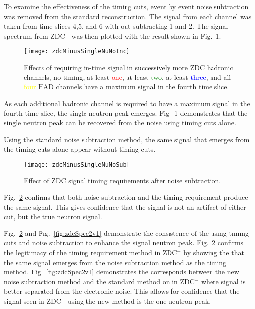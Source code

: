       To examine the effectiveness of the timing cuts, event by event noise 
        subtraction was removed from the standard reconstruction.
      The signal from each channel was taken from time slices 4,5, and 6 with
        out subtracting 1 and 2.
      The signal spectrum from ZDC$^{-}$ was then plotted with the result
        shown in Fig.~\ref{fig:zdcTimingCuts}.
      \begin{figure}[!Hhbt]
        \centering
        \texttt{[image: zdcMinusSingleNuNoInc]}
        \caption{Effects of requiring in-time signal in successively more 
          ZDC hadronic channels, no timing, at least \textcolor{red}{one}, at least \textcolor{green}{two},
            at least \textcolor{blue}{three}, and all \textcolor{yellow}{four} HAD channels have a maximum signal
            in the fourth time slice.}
        \label{fig:zdcTimingCuts}
      \end{figure}
      As each additional hadronic channel is required to have a maximum signal
        in the fourth time slice, the single neutron peak emerges. 
      Fig.~\ref{fig:zdcTimingCuts} demonstrates that the single neutron peak 
        can be recovered from the noise using timing cuts alone. 

      Using the standard noise subtraction method, the same signal that emerges
        from the timing cuts alone appear without timing cuts.
       \begin{figure}[h]
        \centering
        \texttt{[image: zdcMinusSingleNuNoSub]}
        \caption{Effect of ZDC signal timing requirements after noise 
          subtraction.}
        \label{fig:zdcTimingAfterNoiseSub}
      \end{figure}
      Fig.~\ref{fig:zdcTimingAfterNoiseSub} confirms that both noise 
        subtraction and the timing requirement produce the same signal.
      This gives confidence that the signal is not an artifact of either cut, 
        but the true neutron signal.

       Fig.~\ref{fig:zdcTimingAfterNoiseSub} and Fig.~\ref{fig:zdcSpec2v1} 
        demonstrate the consistence of the using timing cuts and noise 
        subtraction to enhance the signal neutron peak. 
      Fig.~\ref{fig:zdcTimingAfterNoiseSub} confirms the legitimacy of the 
        timing requirement method in ZDC$^{-}$ by showing the that the same
        signal emerges from the noise subtraction method as the timing method.
      Fig.~\ref{fig:zdcSpec2v1} demonstrates the corresponds between
        the new noise subtraction method and the standard method on in 
        ZDC$^{-}$ where signal is better separated from the electronic noise. 
      This allows for confidence that the signal seen in ZDC$^{+}$ using 
        the new method is the one neutron peak.

